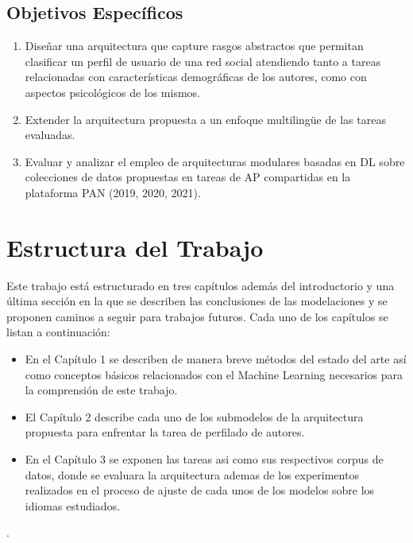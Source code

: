 \subsection*{Objetivos Específicos}
\begin{enumerate}
	\item Diseñar una arquitectura que capture rasgos abstractos que permitan clasificar un perfil de usuario de una red social atendiendo tanto a tareas relacionadas con características demográficas de los autores, como con aspectos psicológicos de los mismos.
	\item Extender la arquitectura propuesta a un enfoque multilingüe de las tareas evaluadas.
	\item Evaluar y analizar el empleo de arquitecturas modulares basadas en DL sobre colecciones de datos propuestas en tareas de AP compartidas en la plataforma PAN (2019, 2020, 2021).
\end{enumerate}
\section*{Estructura del Trabajo}
Este trabajo está estructurado en tres capítulos además del introductorio y una última sección en la que se describen las conclusiones de las modelaciones y se proponen  caminos a seguir para trabajos futuros. Cada uno de los capítulos se listan a continuación: 

\begin{itemize}
	\item En el Capítulo 1 se describen de manera breve métodos del estado del arte así como conceptos básicos relacionados con el Machine Learning necesarios para la comprensión de este trabajo.
	\item El Capítulo 2 describe cada uno de los submodelos de la arquitectura propuesta para enfrentar la tarea de perfilado de autores.
	\item En el Capítulo 3 se exponen las tareas asi como sus respectivos corpus de datos, donde se evaluara la arquitectura ademas de  los experimentos realizados en el proceso de ajuste de cada unos de los modelos sobre los idiomas estudiados. 
\end{itemize}
. 